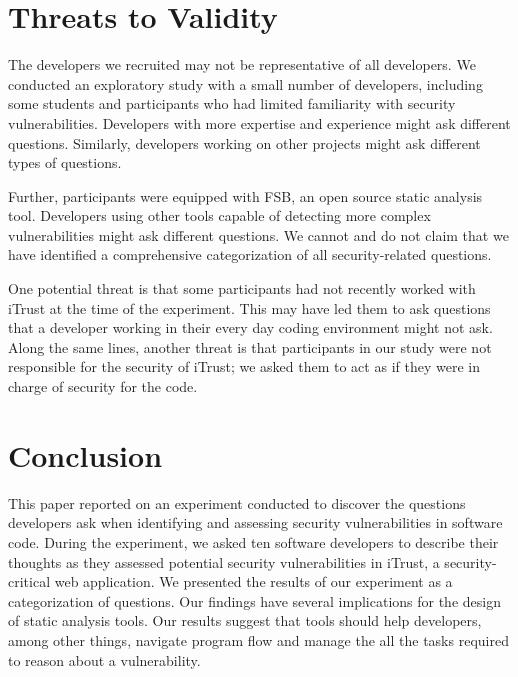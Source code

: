 \documentclass{acm_proc_article-sp}
\begin{document}
\section{Threats to Validity}
\label{limits}
The developers we recruited may not be representative of all developers.
We conducted an exploratory study with a small number of developers, including some students and participants who had limited familiarity with security vulnerabilities.
Developers with more expertise and experience might ask different questions.
Similarly, developers working on other projects might ask different types of questions.

Further, participants were equipped with FSB, an open source static analysis tool. 
Developers using other tools capable of detecting more complex vulnerabilities might ask different questions.
We cannot and do not claim that we have identified a comprehensive categorization of all security-related questions.

One potential threat is that some participants had not recently worked with iTrust at the time of the experiment. 
This may have led them to ask questions that a developer working in their every day coding environment might not ask. 
Along the same lines, another threat is that participants in our study were not responsible for the security of iTrust; we asked them to act as if they were in charge of security for the code.  



\section{Conclusion}
\label{sec:concl}
This paper reported on an experiment conducted to discover the questions developers ask when identifying and assessing security vulnerabilities in software code.
During the experiment, we asked ten software developers to describe their thoughts as they assessed potential security vulnerabilities in iTrust, a security-critical web application.
We presented the results of our experiment as a categorization of questions.
Our findings have several implications for the design of static analysis tools. Our results suggest that tools should help developers, among other things, navigate program flow and manage the all the tasks required to reason about a vulnerability.





\end{document}
